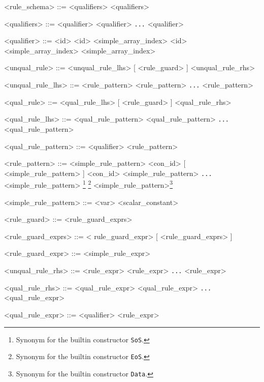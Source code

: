 \begin{grammar}
<rule_schema> ::= <qualifiers> \lit{\texttt{->}} <qualifiers>

<qualifiers> ::= <qualifier>
                    \alt \lit{(} <qualifier> \lit{,} \texttt{...} \lit{,} <qualifier> \lit{)}

<qualifier> ::= <id>
  \alt <id> \lit{[} <simple_array_index> \lit{]}
  \alt <id> \lit{[} <simple_array_index> \lit{]} \lit{[} <simple_array_index> \lit{]}

<unqual_rule> ::= \lit{|} <unqual_rule_lhs> [ <rule_guard> ] \lit{\texttt{->}} <unqual_rule_rhs>

<unqual_rule_lhs> ::= <rule_pattern> 
             \alt \lit{(} <rule_pattern> \lit{,} \texttt{...} \lit{,} <rule_pattern> \lit{)}

<qual_rule> ::= \lit{|} <qual_rule_lhs> [ <rule_guard> ] \lit{\texttt{->}} <qual_rule_rhs>

<qual_rule_lhs> ::= <qual_rule_pattern> 
             \alt \lit{(} <qual_rule_pattern> \lit{,} \texttt{...} \lit{,} <qual_rule_pattern> \lit{)}

<qual_rule_pattern> ::= <qualifier> \lit{:} <rule_pattern>

<rule_pattern> ::= <simple_rule_pattern> 
                 \alt <con_id> [ <simple_rule_pattern> ]
                 \alt <con_id> \lit{(} <simple_rule_pattern> \lit{,} \texttt{...} \lit{,} <simple_rule_pattern> \lit{)}
                 \alt {}\footnote{\label{fn:sos}Synonym for the builtin constructor \texttt{SoS}.}
                 \alt {}\footnote{\label{fn:eos}Synonym for the builtin constructor \texttt{EoS}.}
                 \alt {} <simple_rule_pattern>\footnote{\label{fn:data}Synonym for the builtin constructor \texttt{Data}.}
                 \alt \lit{_}                         %

<simple_rule_pattern> ::= <var>               
                 \alt <scalar_constant>           
                 \alt \lit{_}                         

<rule_guard> ::=  <rule_guard_exprs>

<rule_guard_exprs> ::= < rule_guard_expr> [   <rule_guard_exprs> ]

<rule_guard_expr> ::= <simple_rule_expr>

<unqual_rule_rhs> ::= <rule_expr>
             \alt \lit{(} <rule_expr> \lit{,} \texttt{...} \lit{,} <rule_expr> \lit{)}

<qual_rule_rhs> ::= <qual_rule_expr>
             \alt \lit{(} <qual_rule_expr> \lit{,} \texttt{...} \lit{,} <qual_rule_expr> \lit{)}

<qual_rule_expr> ::= <qualifier> \lit{:} <rule_expr>
\end{grammar}

